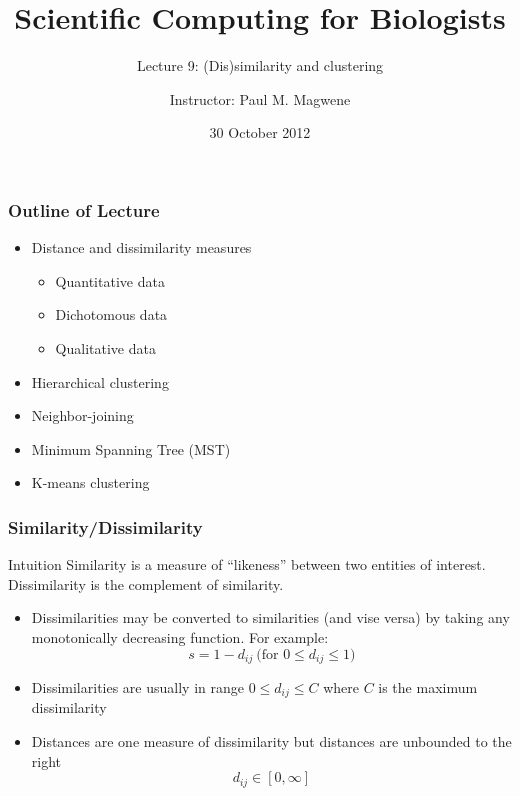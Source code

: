 \documentclass{beamer}
\title{Scientific Computing for Biologists}
\subtitle{Lecture 9: (Dis)similarity and clustering}
\author{Instructor: Paul M. Magwene}
\date{30 October 2012}
\begin{document}
\begin{frame}
\titlepage
\end{frame}



\begin{frame}
  \frametitle{Outline of Lecture}
  
\begin{itemize}
    \item Distance and dissimilarity measures
    \begin{itemize}
        \item Quantitative data
        \item Dichotomous data
        \item Qualitative data
    \end{itemize}
    \item Hierarchical clustering
    \item Neighbor-joining
    \item Minimum Spanning Tree (MST)
    \item K-means clustering
\end{itemize}     
  
\end{frame}

\begin{frame}
  \frametitle{Similarity/Dissimilarity}

\begin{block}{Intuition}
Similarity is a measure of ``likeness'' between two entities of interest. Dissimilarity is the complement of similarity.
\end{block}


\begin{itemize}
\item Dissimilarities may be converted to similarities (and vise versa) by taking any monotonically decreasing function. For example:
\[
s = 1 - d_{ij}  \ \mbox{(for $0 \leq d_{ij} \leq 1$)}
\]
\item Dissimilarities are usually in range $0 \leq d_{ij} \leq C$ where $C$ is the maximum dissimilarity
\item Distances are one measure of dissimilarity but distances are unbounded to the right
\[
d_{ij} \in [0,\infty]
\]
\end{itemize}
\end{frame}
\end{document}
